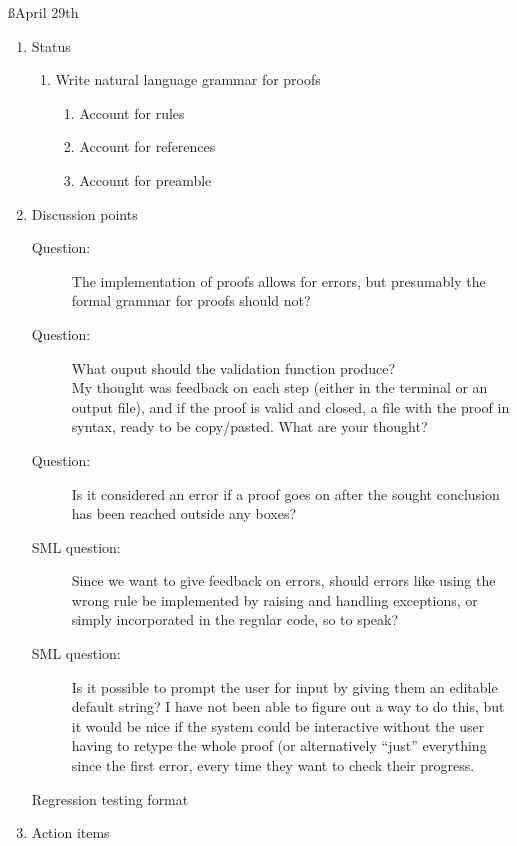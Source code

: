 \documentclass[a4paper]{article}
\begin{document}
\ss{April 29th}
\begin{enumerate}
  \item Status
    \begin{enumerate}[\HollowBox]
      \item[\Checkedbox] Write natural language grammar for proofs
        \begin{enumerate}[\HollowBox]
          \item[\Checkedbox] Account for rules
          \item[\Checkedbox] Account for references
          \item[\Checkedbox] Account for preamble
        \end{enumerate}
    \end{enumerate}
  \item Discussion points
    \begin{description}
      \item[Question:] The implementation of proofs allows for errors, but
      presumably the formal grammar for proofs should not?
      \item[Question:] What ouput should the validation function produce?\\
      My thought was feedback on each step (either in the terminal or an 
      output file), and if the proof is valid and closed, a file with the
      proof in  syntax, ready to be copy/pasted. What are your
      thought?
      \item[Question:] Is it considered an error if a proof goes on after
      the sought conclusion has been reached outside any boxes?
      \item[SML question:] Since we want to give feedback on errors, should
      errors like using the wrong rule be implemented by raising and 
      handling exceptions, or simply incorporated in the regular code, so
      to speak?
      \item[SML question:] Is it possible to prompt the user for input by
      giving them an editable default string? I have not been able to figure
      out a way to do this, but it would be nice if the system could be 
      interactive without the user having to retype the whole proof (or
      alternatively ``just'' everything since the first error, every time
      they want to check their progress.
      \item[Regression testing format]
    \end{description}
  \item Action items
    \begin{enumerate}[\HollowBox]

\end{enumerate}
\end{enumerate}
\end{document}
